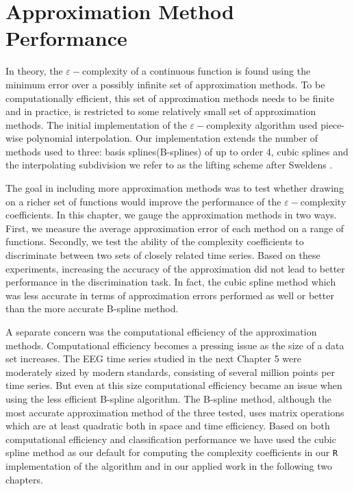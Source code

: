 \chapter{Approximation Method Performance}

In theory, the $\varepsilon-$complexity of a continuous function is found using the minimum error over a possibly infinite set of approximation methods. To be computationally efficient, this set of approximation methods needs to be finite and in practice, is restricted to some relatively small set of approximation methods. The initial implementation of the $\varepsilon-$complexity algorithm used piece-wise polynomial interpolation. Our implementation extends the number of methods used to three: basis splines(B-splines) of up to order 4, 
cubic splines and the interpolating subdivision we refer to as the lifting scheme after Sweldens \cite{sweldens1998}. 

The goal in including more approximation methods was to test whether drawing on a richer set of functions would improve the performance of the $\varepsilon-$complexity coefficients. In this chapter, we gauge the approximation methods in two ways. First, we measure the average approximation error of each method on a range of functions. 
Secondly, we test the 
ability of the complexity coefficients to discriminate between two sets of closely related time series. Based on these experiments, increasing the accuracy of the approximation did not lead to better performance in the discrimination task. In fact, the cubic spline method which was less accurate in terms of approximation errors performed as well or better than the more accurate B-spline method.

A separate concern was the computational efficiency of the approximation methods. Computational efficiency becomes a pressing issue as the size of a data set increases. The EEG time series studied in the next Chapter 5 were moderately sized by modern standards, consisting of several million points per time series. But even at this size computational efficiency became an issue when using the less efficient B-spline algorithm. The B-spline method, although the most accurate approximation method of the three tested, uses matrix operations which are at least quadratic both in space and time efficiency. Based on both computational efficiency and classification performance we have used the cubic spline method as our default for computing the complexity coefficients in our \texttt{R} implementation of the algorithm and in our applied work in the following two chapters.

